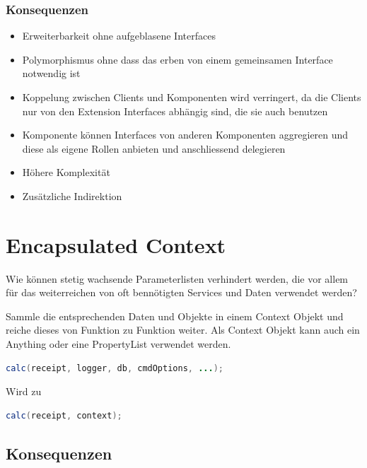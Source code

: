 \subsubsection*{Konsequenzen}

\begin{itemize}
	\item Erweiterbarkeit ohne aufgeblasene Interfaces
	\item Polymorphismus ohne dass das erben von einem gemeinsamen Interface notwendig ist
	\item Koppelung zwischen Clients und Komponenten wird verringert, da die Clients nur von den Extension Interfaces abhängig sind, die sie auch benutzen
	\item Komponente können Interfaces von anderen Komponenten aggregieren und diese als eigene Rollen anbieten und anschliessend delegieren
	\item Höhere Komplexität
	\item Zusätzliche Indirektion
\end{itemize}

\section{Encapsulated Context}

Wie können stetig wachsende Parameterlisten verhindert werden, die vor allem für das weiterreichen von oft bennötigten Services und Daten verwendet werden?

Sammle die entsprechenden Daten und Objekte in einem Context Objekt und reiche dieses von Funktion zu Funktion weiter. Als Context Objekt kann auch ein Anything oder eine PropertyList verwendet werden.

\begin{lstlisting}[language=Java, caption={Encapsulated Context Beispiel mit langer Parameter Liste}]
calc(receipt, logger, db, cmdOptions, ...);
\end{lstlisting}

Wird zu

\begin{lstlisting}[language=Java, caption={Encapsulated Context Beispiel mit Context}]
calc(receipt, context);
\end{lstlisting}


\subsection*{Konsequenzen}

